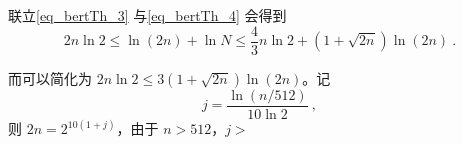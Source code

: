 联立\autoref{eq_bertTh_3} 与\autoref{eq_bertTh_4} 会得到
\begin{equation}
2n \ln 2 \le \ln(2n) + \ln N \le \frac43 n \ln 2 + (1+\sqrt{2n}) \ln(2n) ~.
\end{equation}

而可以简化为 $2n\ln2\le3(1+\sqrt{2n})\ln(2n)$。记
\begin{equation}
j = \frac{\ln(n/512)}{10 \ln 2} ~,
\end{equation}
则 $2n = 2^{10(1+j)}$，由于 $n  > 512$，$j >$
